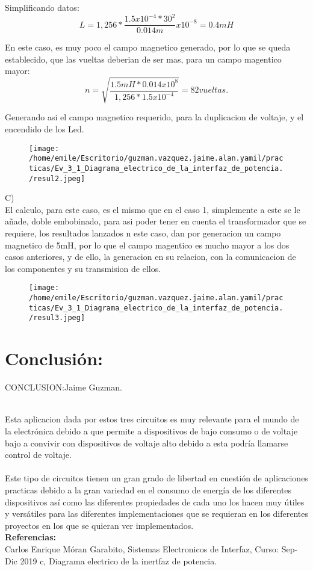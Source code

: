 \documentclass[11pt]{article}
\begin{document}
Simplificando datos:\\
$$ L=1,256* \frac{1.5x10^{-4} * 30^{2}}{0.014m}x10^{-8}= 0.4mH $$

En este caso, es muy poco el campo magnetico generado, por lo que se queda establecido, que las vueltas deberian de ser mas, para un campo magentico mayor:\\
$$ n=\sqrt{\frac{1.5mH*0.014x10^{8}}{1,256 * 1.5x10^{-4}}}= 82 vueltas. $$

Generando asi el campo magnetico requerido, para la duplicacion de voltaje, y el encendido de los Led.\\

\begin{figure}[htp]
\centering
\texttt{[image: /home/emile/Escritorio/guzman.vazquez.jaime.alan.yamil/practicas/Ev\_3\_1\_Diagrama\_electrico\_de\_la\_interfaz\_de\_potencia./resul2.jpeg]}
\caption{}
\label{}
\end{figure}

C)\\

El calculo, para este caso, es el mismo que en el caso 1, simplemente a este se le añade, doble embobinado, para asi poder tener en cuenta el transformador que se requiere, los resultados lanzados n este caso, dan por generacion un campo magnetico de 5mH, por lo que el campo magentico es mucho mayor a los dos casos anteriores, y de ello, la generacion en su relacion, con la comunicacion de los componentes y su transmision de ellos.

\begin{figure}[htp]
\centering
\texttt{[image: /home/emile/Escritorio/guzman.vazquez.jaime.alan.yamil/practicas/Ev\_3\_1\_Diagrama\_electrico\_de\_la\_interfaz\_de\_potencia./resul3.jpeg]}
\caption{}
\label{}
\end{figure}

\section{Conclusión:}

CONCLUSION:Jaime Guzman.\\\

Esta aplicacion dada por estos tres circuitos es muy relevante para el mundo de la electrónica debido a que permite a dispositivos de bajo consumo o de voltaje bajo a convivir con dispositivos de voltaje alto debido a esta podría llamarse control de voltaje.\\\\
Este tipo de circuitos tienen un gran grado de libertad en cuestión de aplicaciones practicas debido a la gran variedad en el consumo de energía de los diferentes dispositivos así como las diferentes propiedades de cada uno los hacen muy útiles y versátiles para las diferentes implementaciones que se requieran en los diferentes proyectos en los que se quieran ver implementados.\\



\textbf{\Large Referencias:}\\
Carlos Enrique Móran Garabito, Sistemas Electronicos de Interfaz, Curso: Sep-Dic 2019 c, Diagrama electrico de la inertfaz de potencia.
\end{document}
